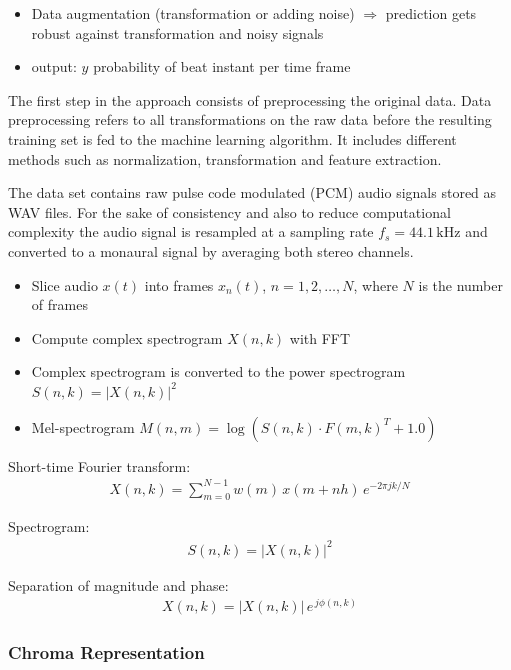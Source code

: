 \documentclass{scrartcl}
\begin{document}
\begin{itemize}
\item Data augmentation (transformation or adding noise) $\Rightarrow$ prediction gets robust against transformation and noisy signals
\item output: $y$ probability of beat instant per time frame 
\end{itemize}



The first step in the approach consists of preprocessing the original data. Data preprocessing refers to all transformations on the raw data before the resulting training set is fed to the machine learning algorithm. It includes different methods such as normalization, transformation and feature extraction. 

The data set contains raw pulse code modulated (PCM) audio signals stored as WAV files. For the sake of consistency and also to reduce computational complexity the audio signal is resampled at a sampling rate $f_s = 44.1 \,\text{kHz}$ and converted to a monaural signal by averaging both stereo channels. 


\begin{itemize}
\item Slice audio $x(t)$ into frames $x_n(t)$, $n = 1, 2,\dots, N$, where $N$ is the number of frames
\item Compute complex spectrogram $X(n,k)$ with FFT 
\item Complex spectrogram is converted to the power spectrogram $S(n, k) = |X(n, k)|^2$
\item Mel-spectrogram $M(n,m) = \log \left( S(n,k) \cdot F(m,k)^T + 1.0 \right)$
\end{itemize}
\vspace{1em}

Short-time Fourier transform:
\begin{align}
X(n,k) = \sum_{m = 0}^{N-1} w(m) \, x(m + n  h) \, e^{-2 \pi j  k /N}
\end{align} 

Spectrogram: 
\begin{align}
S(n,k) = |X(n,k)|^2
\end{align} 

Separation of magnitude and phase:
\begin{align} 
X(n,k) = |X(n,k)| \, e^{\, j \phi(n,k)}
\end{align} 


\subsubsection{Chroma Representation}
\end{document}
